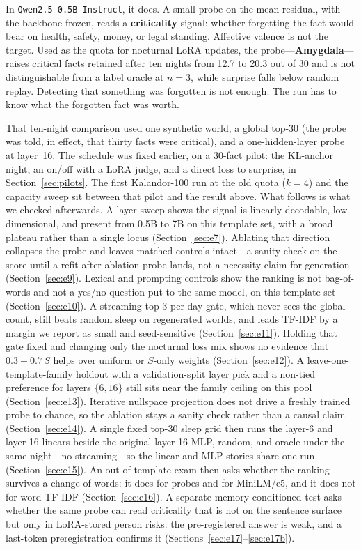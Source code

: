 \documentclass[11pt,a4paper]{article}
\begin{document}
In \texttt{Qwen2.5-0.5B-Instruct}, it does.
A small probe on the mean residual, with the backbone frozen, reads a \textbf{criticality} signal: whether forgetting the fact would bear on health, safety, money, or legal standing.
Affective valence is not the target.
Used as the quota for nocturnal LoRA updates, the probe---\textbf{Amygdala}---raises critical facts retained after ten nights from 12.7 to 20.3 out of 30 and is not distinguishable from a label oracle at $n{=}3$, while surprise falls below random replay.
Detecting that something was forgotten is not enough.
The run has to know what the forgotten fact was worth.

That ten-night comparison used one synthetic world, a global top-30 (the probe was told, in effect, that thirty facts were critical), and a one-hidden-layer probe at layer~16.
The schedule was fixed earlier, on a 30-fact pilot: the KL-anchor night, an on/off with a LoRA judge, and a direct loss to surprise, in Section~\ref{sec:pilots}.
The first Kalandor-100 run at the old quota ($k{=}4$) and the capacity sweep sit between that pilot and the result above.
What follows is what we checked afterwards.
A layer sweep shows the signal is linearly decodable, low-dimensional, and present from 0.5B to 7B on this template set, with a broad plateau rather than a single locus (Section~\ref{sec:e7}).
Ablating that direction collapses the probe and leaves matched controls intact---a sanity check on the score until a refit-after-ablation probe lands, not a necessity claim for generation (Section~\ref{sec:e9}).
Lexical and prompting controls show the ranking is not bag-of-words and not a yes/no question put to the same model, on this template set (Section~\ref{sec:e10}).
A streaming top-3-per-day gate, which never sees the global count, still beats random sleep on regenerated worlds, and leads TF-IDF by a margin we report as small and seed-sensitive (Section~\ref{sec:e11}).
Holding that gate fixed and changing only the nocturnal loss mix shows no evidence that $0.3{+}0.7\,S$ helps over uniform or $S$-only weights (Section~\ref{sec:e12}).
A leave-one-template-family holdout with a validation-split layer pick and a non-tied preference for layers $\{6,16\}$ still sits near the family ceiling on this pool (Section~\ref{sec:e13}).
Iterative nullspace projection does not drive a freshly trained probe to chance, so the ablation stays a sanity check rather than a causal claim (Section~\ref{sec:e14}).
A single fixed top-30 sleep grid then runs the layer-6 and layer-16 linears beside the original layer-16 MLP, random, and oracle under the same night---no streaming---so the linear and MLP stories share one run (Section~\ref{sec:e15}).
An out-of-template exam then asks whether the ranking survives a change of words: it does for probes and for MiniLM/e5, and it does not for word TF-IDF (Section~\ref{sec:e16}).
A separate memory-conditioned test asks whether the same probe can read criticality that is not on the sentence surface but only in LoRA-stored person risks: the pre-registered answer is weak, and a last-token preregistration confirms it (Sections~\ref{sec:e17}--\ref{sec:e17b}).
\end{document}
